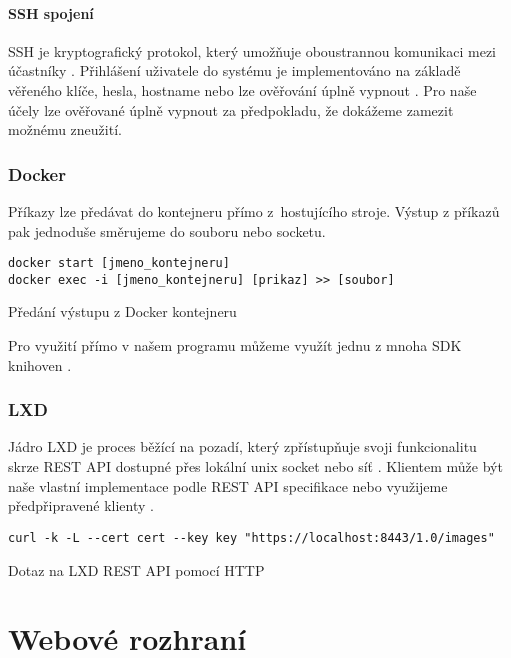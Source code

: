 \paragraph{SSH spojení}

SSH je kryptografický protokol, který umožňuje oboustrannou komunikaci mezi účastníky \cite{ssh_rfc}.
Přihlášení uživatele do systému je implementováno na základě věřeného klíče, hesla, hostname nebo lze ověřování úplně vypnout \cite{ssh_auth_rfc}.
Pro naše účely lze ověřované úplně vypnout za předpokladu, že dokážeme zamezit možnému zneužití.

\subsubsection{Docker}

Příkazy lze předávat do kontejneru přímo z~hostujícího stroje.
Výstup z příkazů pak jednoduše směrujeme do souboru nebo socketu.

\begin{listing}[ht]
\begin{verbatim}
docker start [jmeno_kontejneru]
docker exec -i [jmeno_kontejneru] [prikaz] >> [soubor]
\end{verbatim}
\caption{Předání výstupu z Docker kontejneru}
\end{listing}

Pro využití přímo v našem programu můžeme využít jednu z mnoha SDK knihoven \cite{docker_sdk}.

\subsubsection{LXD}

Jádro LXD je proces běžící na pozadí, který zpřístupňuje svoji funkcionalitu skrze REST API dostupné přes lokální unix socket nebo síť \cite{lxd}.
Klientem může být naše vlastní implementace podle REST API specifikace nebo využijeme předpřipravené klienty \cite{lxd_rest}.

\begin{listing}[ht]
\begin{verbatim}
curl -k -L --cert cert --key key "https://localhost:8443/1.0/images"
\end{verbatim}
\caption{Dotaz na LXD REST API pomocí HTTP}
\end{listing}

\section{Webové rozhraní}

